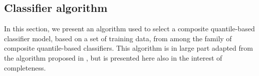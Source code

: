 

\subsection{Classifier algorithm}
\label{sec:classifier-algorithm}

In this section, we present an algorithm used to select a composite
quantile-based classifier model, based on a set of training data, from among the
family of composite quantile-based classifiers.  This algorithm is in large part
adapted from the algorithm proposed in \cite{fan2016}, but is presented here
also in the interest of completeness.

